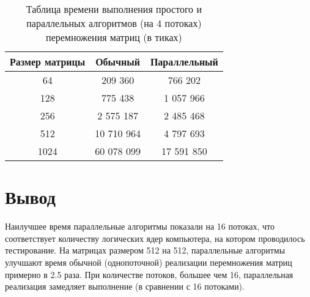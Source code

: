     \begin{table} [h!]
    	\caption{Таблица времени выполнения простого и параллельных алгоритмов (на 4 потоках) перемножения матриц (в тиках)}
    	\begin{center}
    		\begin{tabular}{|c c c|} 
    			\hline
    			Размер матрицы & Обычный & Параллельный\\  
    			\hline
    			64 & 209 360 & 766 202 \\
    			\hline
    			128 & 775 438 & 1 057 966 \\
    			\hline
    			256 & 2 575 187 & 2 485 468 \\
    			\hline
    			512 & 10 710 964 & 4 797 693 \\
    			\hline
    			1024 & 60 078 099 & 17 591 850 \\
    			\hline
    		\end{tabular}
    	\end{center}
    \end{table}
    
    \section{Вывод}
    
    Наилучшее время параллельные алгоритмы показали на 16 потоках, что соответствует количеству логических ядер компьютера, на котором проводилось тестирование. На матрицах размером 512 на 512, параллельные алгоритмы улучшают время обычной (однопоточной) реализации перемножения матриц примерно в 2.5 раза. При количестве потоков, большее чем 16, параллельная реализация замедляет выполнение (в сравнении с 16 потоками).
    

\newpage